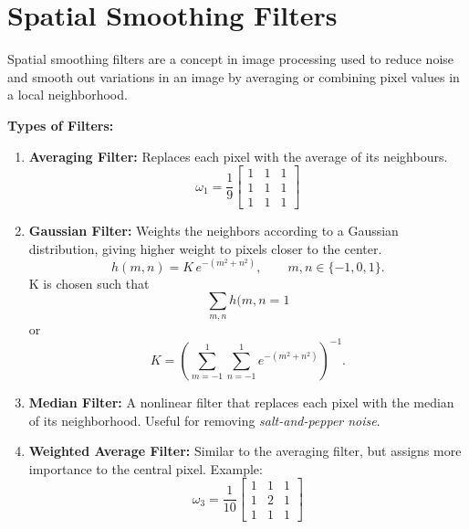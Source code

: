 \documentclass[12 pt]{article}        	%
\begin{document}

\section{Spatial Smoothing Filters}
Spatial smoothing filters are a concept in image processing used to reduce noise 
and smooth out variations in an image by averaging or combining pixel values 
in a local neighborhood.

\vspace{4pt}
\textbf{Types of Filters:}
\begin{enumerate}
    \item \textbf{Averaging Filter:} Replaces each pixel with the average of its neighbours.  
    \[
    \omega_1 = \frac{1}{9}
    \begin{bmatrix}
        1 & 1 & 1 \\
        1 & 1 & 1 \\
        1 & 1 & 1
    \end{bmatrix}
    \]

    \item \textbf{Gaussian Filter:} Weights the neighbors according to a Gaussian distribution, 
    giving higher weight to pixels closer to the center.  
    \[
    h(m,n) = K\, e^{-(m^2+n^2)}, \qquad m,n \in \{-1,0,1\}.
    \]
    K is chosen such that 
    \[
    \sum_{m,n}{h(m,n} = 1
    \]
    or
    \[
K=\left(\sum_{m=-1}^{1}\sum_{n=-1}^{1} e^{-(m^2+n^2)}\right)^{-1}.
\]
    
    \item \textbf{Median Filter:} A nonlinear filter that replaces each pixel 
    with the median of its neighborhood.  
    Useful for removing \emph{salt-and-pepper noise}.

    \item \textbf{Weighted Average Filter:} Similar to the averaging filter, 
    but assigns more importance to the central pixel.  
    Example:  
    \[
    \omega_3 = \frac{1}{10}
    \begin{bmatrix}
        1 & 1 & 1 \\
        1 & 2 & 1 \\
        1 & 1 & 1
    \end{bmatrix}
    \]
\end{enumerate}
\end{document}

